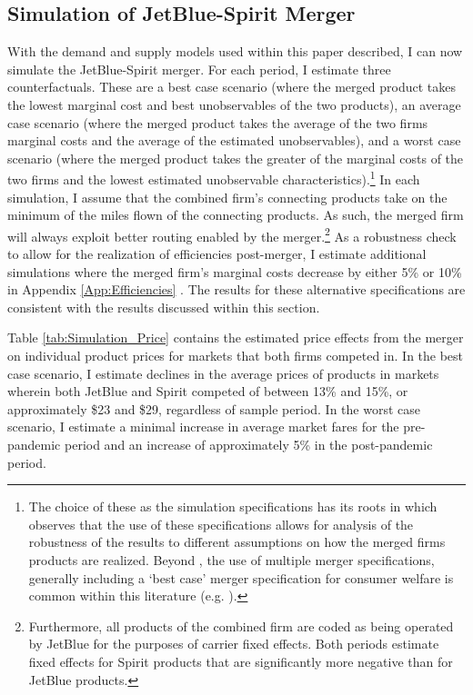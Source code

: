 \documentclass{article}
\begin{document}
	\subsection{Simulation of JetBlue-Spirit Merger}
	\label{sec:Analysis_Merger}
	With the demand and supply models used within this paper described, I can now simulate the JetBlue-Spirit merger. For each period, I estimate three counterfactuals. These are a best case scenario (where the merged product takes the lowest marginal cost and best unobservables of the two products), an average case scenario (where the merged product takes the average of the two firms marginal costs and the average of the estimated unobservables), and a worst case scenario (where the merged product takes the greater of the marginal costs of the two firms and the lowest estimated unobservable characteristics).\footnote{The choice of these as the simulation specifications has its roots in \citet{ciliberto_market_2021} which observes that the use of these specifications allows for analysis of the robustness of the results to different assumptions on how the merged firms products are realized. Beyond \citet{ciliberto_market_2021}, the use of multiple merger specifications, generally including a `best case' merger specification for consumer welfare is common within this literature (e.g. \citet{li_repositioning_2022}).} In each simulation, I assume that the combined firm's connecting products take on the minimum of the miles flown of the connecting products. As such, the merged firm will always exploit better routing enabled by the merger.\footnote{Furthermore, all products of the combined firm are coded as being operated by JetBlue for the purposes of carrier fixed effects. Both periods estimate fixed effects for Spirit products that are significantly more negative than for JetBlue products.} As a robustness check to allow for the realization of efficiencies post-merger, I estimate additional simulations where the merged firm's marginal costs decrease by either 5\% or 10\% in Appendix \ref{App:Efficiencies} . The results for these alternative specifications are consistent with the results discussed within this section.

     
	Table \ref{tab:Simulation_Price} contains the estimated price effects from the merger on individual product prices for markets that both firms competed in. In the best case scenario, I estimate declines in the average prices of products in markets wherein both JetBlue and Spirit competed of between 13\% and 15\%, or approximately \$23 and \$29, regardless of sample period. In the worst case scenario, I estimate a minimal increase in average market fares for the pre-pandemic period and an increase of approximately 5\% in the post-pandemic period. 
     
\end{document}
